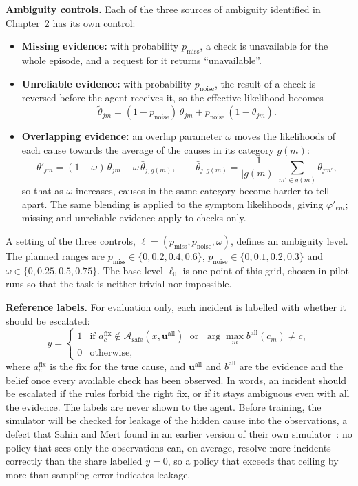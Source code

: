 \textbf{Ambiguity controls.} Each of the three sources of ambiguity identified in Chapter~2 has its own control:
\begin{itemize}
\item \textbf{Missing evidence:} with probability $p_{\text{miss}}$, a check is unavailable for the whole episode, and a request for it returns ``unavailable''.
\item \textbf{Unreliable evidence:} with probability $p_{\text{noise}}$, the result of a check is reversed before the agent receives it, so the effective likelihood becomes
\begin{equation}
\tilde{\theta}_{jm} = (1 - p_{\text{noise}})\,\theta_{jm} + p_{\text{noise}}\,(1 - \theta_{jm}).
\end{equation}
\item \textbf{Overlapping evidence:} an overlap parameter $\omega$ moves the likelihoods of each cause towards the average of the causes in its category $g(m)$:
\begin{equation}
\theta'_{jm} = (1 - \omega)\,\theta_{jm} + \omega\,\bar{\theta}_{j,g(m)}, \qquad
\bar{\theta}_{j,g(m)} = \frac{1}{|g(m)|} \sum_{m' \in g(m)} \theta_{jm'},
\label{eq:overlap}
\end{equation}
so that as $\omega$ increases, causes in the same category become harder to tell apart. The same blending is applied to the symptom likelihoods, giving $\varphi'_{em}$; missing and unreliable evidence apply to checks only.
\end{itemize}
A setting of the three controls, $\ell = (p_{\text{miss}}, p_{\text{noise}}, \omega)$, defines an ambiguity level. The planned ranges are $p_{\text{miss}} \in \{0, 0.2, 0.4, 0.6\}$, $p_{\text{noise}} \in \{0, 0.1, 0.2, 0.3\}$ and $\omega \in \{0, 0.25, 0.5, 0.75\}$. The base level $\ell_0$ is one point of this grid, chosen in pilot runs so that the task is neither trivial nor impossible.

\textbf{Reference labels.} For evaluation only, each incident is labelled with whether it should be escalated:
\begin{equation}
y = \begin{cases}
1 & \text{if } a^{\text{fix}}_{c} \notin \mathcal{A}_{\text{safe}}(x, \mathbf{u}^{\text{all}}) \;\text{ or }\; \arg\max_{m} b^{\text{all}}(c_m) \neq c, \\
0 & \text{otherwise},
\end{cases}
\label{eq:labels}
\end{equation}
where $a^{\text{fix}}_{c}$ is the fix for the true cause, and $\mathbf{u}^{\text{all}}$ and $b^{\text{all}}$ are the evidence and the belief once every available check has been observed. In words, an incident should be escalated if the rules forbid the right fix, or if it stays ambiguous even with all the evidence. The labels are never shown to the agent. Before training, the simulator will be checked for leakage of the hidden cause into the observations, a defect that Sahin and Mert found in an earlier version of their own simulator~\cite{sahin2026}: no policy that sees only the observations can, on average, resolve more incidents correctly than the share labelled $y = 0$, so a policy that exceeds that ceiling by more than sampling error indicates leakage.

